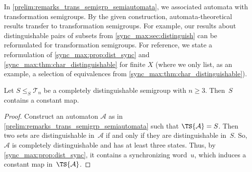 In \cref{prelim:remarks_trans_semigrp_semiautomata},  
we associated automata with transformation semigroups.
By the given construction, automata-theoretical results
transfer to transformation semigroups.
For example, our results
about distinguishable pairs of subsets from \cref{sync_max:sec:distinguish} 
can be reformulated for transformation semigroups.
For reference,
we state a reformulation of \cref{sync_max:prop:dist_sync} and \cref{sync_max:thm:char_distinguishable}
for finite $X$ (where we only list, as an example,
a selection of equivalences from \cref{sync_max:thm:char_distinguishable}).

\begin{proposition}
	\label{sync_max:prop:semigrp:dist_sync}
	Let $S \le_S \mathcal T_n$
	be a completely distinguishable semigroup
	with $n \ge 3$. Then~$S$
	contains a constant map.
\end{proposition}
\begin{proof}
	Construct an automaton $\mathcal A$
	as in \cref{prelim:remarks_trans_semigrp_semiautomata}
	such that $\TS{\mathcal A} = S$.
	Then two sets are distinguishable in~$\mathcal A$
	if and only if they are distinguishable in~$S$.
	So, $\mathcal A$ is completely distinguishable and has at least three states.
	Thus, by \cref{sync_max:prop:dist_sync}, it contains a synchronizing word~$u$,
	which induces a constant map in~$\TS{\mathcal A}$.
\end{proof}

